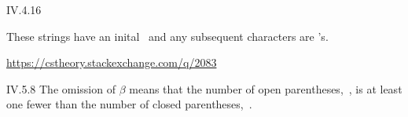 %
%
\begin{ans}{IV.4.16}
  \begin{exparts}
  \item These strings have an inital~ and any subsequent characters are
  's.
  \item \url{https://cstheory.stackexchange.com/q/2083}
  \end{exparts}
  
\end{ans}
%
\begin{ans}{IV.5.8}
The omission of $\beta$ means that the number of
open parentheses,~\str{(}, is at least one fewer than the number of
closed parentheses,~\str{)}.
\end{ans}
%

